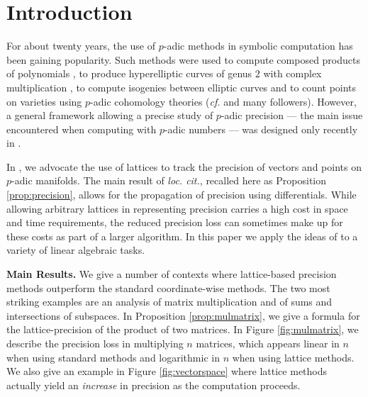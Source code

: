 \documentclass{sig-alternate}
\begin{document}
\section{Introduction}

For about twenty years, the use of $p$-adic methods in symbolic 
computation has been gaining popularity. Such methods were 
used to compute composed products of polynomials 
\cite{boston-gonzalez-perdry-schost:05a}, 
to produce hyperelliptic curves of genus $2$ with complex multiplication 
\cite{gaudry-houtmann-weng-ritzenthaler-kohel:06a},
to compute isogenies between elliptic curves \cite{lercier-sirvent:08a} 
and to count points on varieties using $p$-adic 
cohomology theories (\emph{cf.} \cite{kedlaya:01a,lauder:04a} and many
followers).
However, a general framework allowing a precise study of $p$-adic 
precision --- the main issue encountered when computing 
with $p$-adic numbers --- was designed only recently in 
\cite{caruso-roe-vaccon:14a}. 

In \cite{caruso-roe-vaccon:14a}, we advocate the use of lattices
to track the precision of vectors and points on $p$-adic manifolds.
The main result of \emph{loc. cit.}, recalled here as Proposition \ref{prop:precision},
allows for the propagation of precision using differentials.  While
allowing arbitrary lattices in representing precision carries a high
cost in space and time requirements, the reduced precision loss
can sometimes make up for these costs as part of a larger algorithm.
In this paper we apply the ideas of \cite{caruso-roe-vaccon:14a} to
a variety of linear algebraic tasks.

\smallskip

\noindent
{\bf Main Results.}
We give a number of contexts where lattice-based precision methods
outperform the standard coordinate-wise methods.  The two most striking
examples are an analysis of matrix multiplication and of 
sums and intersections of subspaces.  In Proposition \ref{prop:mulmatrix},
we give a formula for the lattice-precision of the product of two matrices.
In Figure \ref{fig:mulmatrix}, we describe the precision loss in multiplying
$n$ matrices, which appears linear in $n$ when using standard methods
and logarithmic in $n$ when using lattice methods.  We also give an
example in Figure \ref{fig:vectorspace} where lattice methods
actually yield an \emph{increase} in precision as the computation
proceeds.
\end{document}
